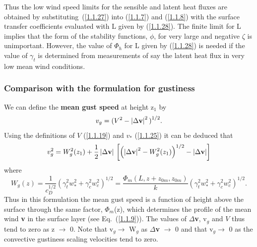 \documentclass{UMDP_article}
\begin{document}
Thus the low wind speed limits for the sensible and latent heat fluxes
are obtained by substituting~(\ref{1.1.27}) into (\ref{1.1.7}) and
(\ref{1.1.8}) with the surface transfer coefficients evaluated with L
given by (\ref{1.1.28}). The finite limit for L implies that the form
of the stability functions, $\phi $, for very large and negative
$\zeta $ is unimportant. However, the value of $\Phi_{h}$ for L given
by (\ref{1.1.28}) is needed if the value of $\gamma _{t}$ is
determined from measurements of say the latent heat flux in very low
mean wind conditions.

\subsubsection[Comparison with Godfrey and Beljaars (1991) formulation for gustiness]
{Comparison with the \cite{godfrey1991} formulation for gustiness}
\label{section_1.2}
We can define the \textbf{mean gust speed} at height z$_{1}$ by
\begin{equation}
  v_g = ( V^2 - \left| {\Delta {{\rm {\bf v}}}} \right|^2 {)}^{{1/2}}.
  \label{1.2.1}
\end{equation}
Using the definitions of $V$ (\ref{1.1.19}) and $v_{\ast }$
(\ref{1.1.25}) it can be deduced that
\begin{equation}
  v_g^2 =  W_g^2 ( z_1 ) + \frac{1}{2}\left| {\Delta {{\rm {\bf v}}}} \right|{ }\left[ {\left( {{ } {\left| {\Delta {{\rm {\bf v}}}} \right|}^2 - W_g^2 ( z_1 )} \right)^{1/2} - \left| {\Delta {{\rm {\bf v}}}} \right|} \right]
  \label{1.2.2}
\end{equation}
where
\begin{equation}
  W_g (z) = \frac{1}{ c_D^{1/2} }  {\left( { \gamma _t^2  w_\ast ^2 +  \gamma _c^2  w_c^2 } \right)}^{1/2} = \frac{ \Phi _m (L , z +  z_{0m} ,  z_{0m} )}{k}  {\left( { \gamma _t^2  w_\ast ^2 +  \gamma _c^2  w_c^2 } \right)}^{1/2}.
  \label{1.2.3}
\end{equation}
Thus in this formulation the mean gust speed is a function of height
above the surface through the same factor, $\Phi _{m}$(z), which
determines the profile of the mean wind \textbf{v} in the surface
layer (see Eq.~(\ref{1.1.9})). The values of $\Delta $\textbf{v},
v$_{g}$ and $V$ thus tend to zero as z $\to $ 0.  Note that v$_{g} \to
$ W$_{g}$ as $\Delta $\textbf{v} $\to $ 0 and that v$_{g} \to $ 0 as
the convective gustiness scaling velocities tend to zero.
\end{document}
